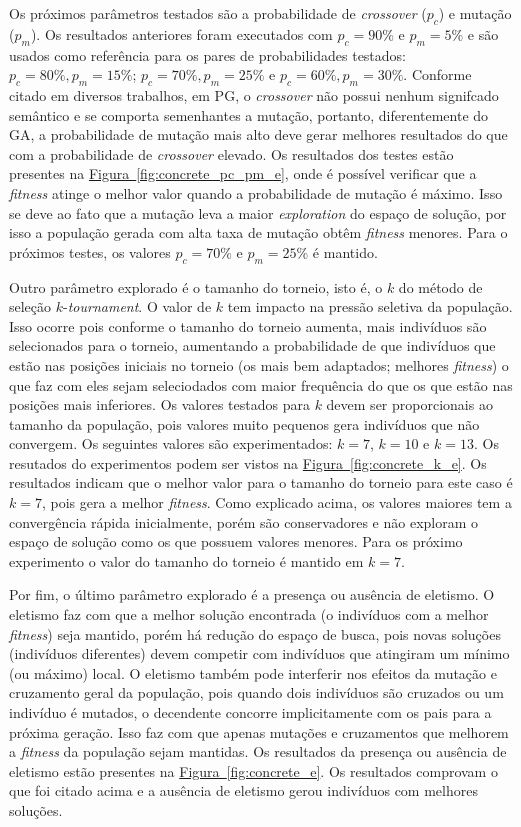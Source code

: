 \documentclass[a4paper]{article}
\begin{document}
Os próximos parâmetros testados são a probabilidade de \textit{crossover}
($p_c$) e mutação ($p_m$). Os resultados anteriores foram executados com
$p_c=90\%$ e $p_m=5\%$ e são usados como referência para os pares de
probabilidades testados:  $p_c=80\%, p_m=15\%$; $p_c=70\%, p_m=25\%$ e
$p_c=60\%, p_m=30\%$. Conforme citado em diversos trabalhos, em PG, o
\textit{crossover} não possui nenhum signifcado semântico e se comporta
semenhantes a mutação, portanto, diferentemente do GA, a probabilidade de
mutação mais alto deve gerar melhores resultados do que com a probabilidade de
\textit{crossover} elevado. Os resultados dos testes estão presentes na
\hyperref[fig:concrete_pc_pm_e]{Figura~\ref*{fig:concrete_pc_pm_e}}, onde é
possível verificar que a \textit{fitness} atinge o melhor valor quando a
probabilidade de mutação é máximo. Isso se deve ao fato que a mutação leva a
maior \textit{exploration} do espaço de solução, por isso a população gerada com
alta taxa de mutação obtêm \textit{fitness} menores. Para o próximos testes, os
valores $p_c = 70\%$ e $p_m = 25\%$ é mantido.

Outro parâmetro explorado é o tamanho do torneio, isto é, o $k$ do método de
seleção $k$-\textit{tournament}. O valor de $k$ tem impacto na pressão seletiva
da população. Isso ocorre pois conforme o tamanho do torneio aumenta, mais
indivíduos são selecionados para o torneio, aumentando a probabilidade de que
indivíduos que estão nas posições iniciais no torneio (os mais bem adaptados;
melhores \textit{fitness}) o que faz com eles sejam seleciodados com maior
frequência do que os que estão nas posições mais inferiores. Os valores testados
para $k$ devem ser proporcionais ao tamanho da população, pois valores muito
pequenos gera indivíduos que não convergem. Os seguintes valores são
experimentados: $k=7$, $k=10$ e $k=13$. Os resutados do experimentos podem ser
vistos na \hyperref[fig:concrete_k_e]{Figura~\ref*{fig:concrete_k_e}}. Os
resultados indicam que o melhor valor para o tamanho do torneio para este caso é
$k=7$, pois gera a melhor \textit{fitness}. Como explicado acima, os valores
maiores tem a convergência rápida inicialmente, porém são conservadores e não
exploram o espaço de solução como os que possuem valores menores. Para os
próximo experimento o valor do tamanho do torneio é mantido em $k=7$.

Por fim, o último parâmetro explorado é a presença ou ausência de eletismo. O
eletismo faz com que a melhor solução encontrada (o indivíduos com a melhor
\textit{fitness}) seja mantido, porém há redução do espaço de busca, pois novas
soluções (indivíduos diferentes) devem competir com indivíduos que atingiram um
mínimo (ou máximo) local. O eletismo também pode interferir nos efeitos da
mutação e cruzamento geral da população, pois quando dois indivíduos são
cruzados ou um indivíduo é mutados, o decendente concorre implicitamente com os
pais para a próxima geração. Isso faz com que apenas mutações e cruzamentos que
melhorem a \textit{fitness} da população sejam mantidas. Os resultados da
presença ou ausência de eletismo estão presentes na
\hyperref[fig:concrete_e]{Figura~\ref*{fig:concrete_e}}. Os resultados comprovam
o que foi citado acima e a ausência de eletismo gerou indivíduos com melhores
soluções.
\end{document}
